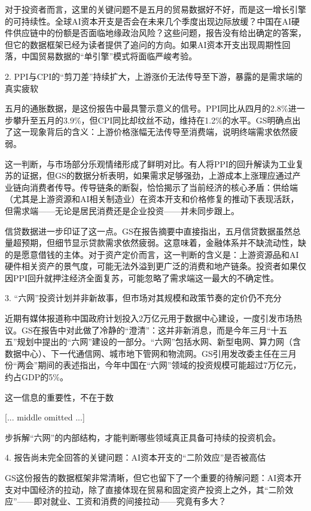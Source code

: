 \documentclass[11pt]{ctexart}
\begin{document}
对于投资者而言，这里的关键问题不是五月的贸易数据好不好，而是这一增长引擎的可持续性。全球AI资本开支是否会在未来几个季度出现边际放缓？中国在AI硬件供应链中的份额是否面临地缘政治风险？这些问题，报告没有给出确定的答案，但它的数据框架已经为读者提供了追问的方向。如果AI资本开支出现周期性回落，中国贸易数据的“单引擎”模式将面临严峻考验。

2. PPI与CPI的“剪刀差”持续扩大，上游涨价无法传导至下游，暴露的是需求端的真实疲软

五月的通胀数据，是这份报告中最具警示意义的信号。PPI同比从四月的2.8\%进一步攀升至五月的3.9\%，但CPI同比却纹丝不动，维持在1.2\%的水平。GS明确点出了这一现象背后的含义：上游价格涨幅无法传导至消费端，说明终端需求依然疲弱。

这一判断，与市场部分乐观情绪形成了鲜明对比。有人将PPI的回升解读为工业复苏的证据，但GS的数据分析表明，如果需求足够强劲，上游成本上涨理应通过产业链向消费者传导。传导链条的断裂，恰恰揭示了当前经济的核心矛盾：供给端（尤其是上游资源和AI相关制造业）在资本开支和价格修复的推动下表现活跃，但需求端——无论是居民消费还是企业投资——并未同步跟上。

信贷数据进一步印证了这一点。GS在报告摘要中直接指出，五月信贷数据虽然总量超预期，但细节显示贷款需求依然疲弱。这意味着，金融体系并不缺流动性，缺的是愿意借钱的主体。对于资产定价而言，这一判断的含义是：上游资源品和AI硬件相关资产的景气度，可能无法外溢到更广泛的消费和地产链条。投资者如果仅因PPI回升就押注经济全面复苏，可能忽略了需求端这一最大的不确定性。

3. “六网”投资计划并非新故事，但市场对其规模和政策节奏的定价仍不充分

近期有媒体报道称中国政府计划投入2万亿元用于数据中心建设，一度引发市场热议。GS在报告中对此做了冷静的“澄清”：这并非新消息，而是今年三月“十五五”规划中提出的“六网”建设的一部分。“六网”包括水网、新型电网、算力网（含数据中心）、下一代通信网、城市地下管网和物流网。GS引用发改委主任在三月份“两会”期间的表述指出，今年中国在“六网”领域的投资规模可能超过7万亿元，约占GDP的5\%。

这一信息的重要性，不在于数

[... middle omitted ...]

步拆解“六网”的内部结构，才能判断哪些领域真正具备可持续的投资机会。

4. 报告尚未完全回答的关键问题：AI资本开支的“二阶效应”是否被高估

GS这份报告的数据框架非常清晰，但它也留下了一个重要的待解问题：AI资本开支对中国经济的拉动，除了直接体现在贸易和固定资产投资上之外，其“二阶效应”——即对就业、工资和消费的间接拉动——究竟有多大？
\end{document}

